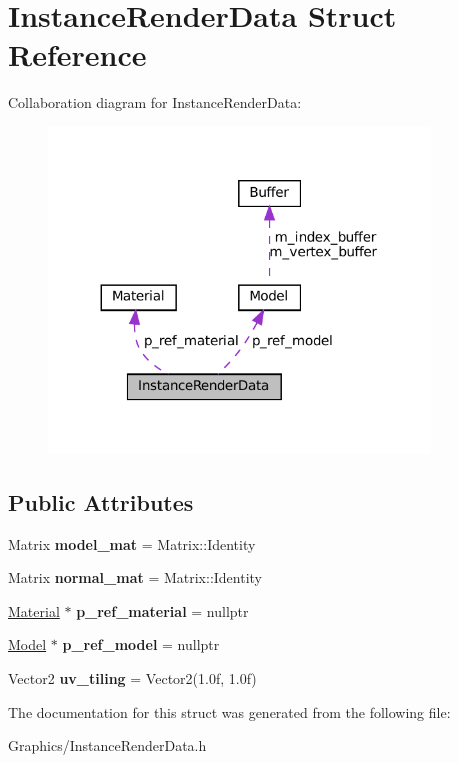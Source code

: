 \hypertarget{structInstanceRenderData}{}\section{Instance\+Render\+Data Struct Reference}
\label{structInstanceRenderData}


Collaboration diagram for Instance\+Render\+Data\+:\nopagebreak
\begin{figure}[H]
\begin{center}
\leavevmode
\includegraphics[width=287pt]{structInstanceRenderData__coll__graph}
\end{center}
\end{figure}
\subsection*{Public Attributes}
\begin{DoxyCompactItemize}
\item 
\mbox{\label{structInstanceRenderData_abe50189306b675492d73a54297b7cfee}} 
Matrix {\bfseries model\+\_\+mat} = Matrix\+::\+Identity
\item 
\mbox{\label{structInstanceRenderData_a86404a581fce1eed5af67fcea84881a0}} 
Matrix {\bfseries normal\+\_\+mat} = Matrix\+::\+Identity
\item 
\mbox{\label{structInstanceRenderData_aec9fe7c8a861214101ee347d59f7c13d}} 
\hyperlink{classMaterial}{Material} $\ast$ {\bfseries p\+\_\+ref\+\_\+material} = nullptr
\item 
\mbox{\label{structInstanceRenderData_a347fddf4e160c3f764e2802571625177}} 
\hyperlink{classModel}{Model} $\ast$ {\bfseries p\+\_\+ref\+\_\+model} = nullptr
\item 
\mbox{\label{structInstanceRenderData_a1da59961082d990cb3b47c9a82a914bb}} 
Vector2 {\bfseries uv\+\_\+tiling} = Vector2(1.\+0f, 1.\+0f)
\end{DoxyCompactItemize}


The documentation for this struct was generated from the following file\+:\begin{DoxyCompactItemize}
\item 
Graphics/Instance\+Render\+Data.\+h\end{DoxyCompactItemize}
